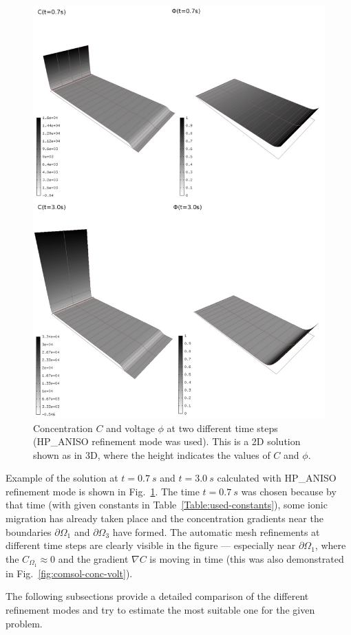 \begin{figure}[!ht]
  \begin{centering}
  \includegraphics[width=.75\columnwidth]{cphi}
  \caption{\label{fig:cphi} Concentration $C$
  and voltage $\phi$ at two different time steps
  (HP\_ANISO refinement mode was used). This is a 2D solution shown
  as in 3D, where the height indicates the values of $C$ and $\phi$.}
  \end{centering}
\end{figure}
Example of the solution at $t=0.7\ s$ and $t=3.0\ s$ 
calculated with HP\_ANISO refinement mode is shown
in Fig.~\ref{fig:cphi}. The time $t=0.7\ s$ was chosen because
by that time (with given constants in Table~\ref{Table:used-constants}),
some ionic migration has already taken place and
the concentration gradients near the boundaries $\partial\Omega_1$ and
$\partial\Omega_3$ have formed. The automatic mesh refinements
at different time steps are clearly visible in the figure --- especially
near $\partial\Omega_1$, where the $C_{\Omega_1}\approx 0$ and
the gradient $\nabla C$ is
moving in time (this was also demonstrated in Fig.~\ref{fig:comsol-conc-volt}).

The following subsections provide a detailed comparison of
the different refinement modes and try to estimate the most suitable
one for the given problem.

